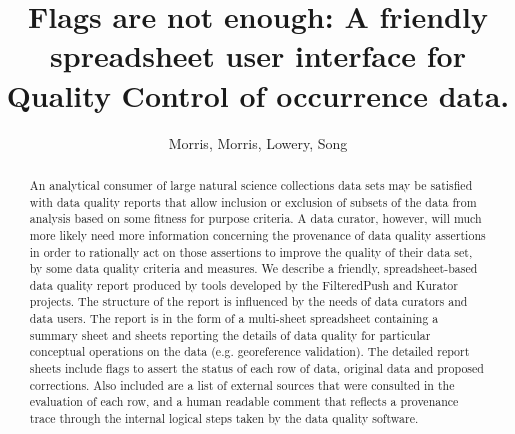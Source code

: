 \documentclass{article}
\begin{document}
\title{Flags are not enough: A friendly spreadsheet user interface for Quality Control of occurrence data.}
\maketitle
\author{Morris, Morris, Lowery, Song}
\begin{abstract}
An analytical consumer of large natural science collections data sets may be satisfied with data quality reports that allow inclusion or exclusion of subsets of the data from analysis based on some fitness for purpose criteria.  A data curator, however, will much more likely need more information concerning the provenance of data quality assertions in order to rationally act on those assertions to improve the quality of their data set, by some data quality criteria and measures.  We describe a friendly, spreadsheet-based data quality report produced by tools developed by the FilteredPush and Kurator projects. The structure of the report is influenced by the needs of data curators and data users.  The report is in the form of a multi-sheet spreadsheet containing a summary sheet and sheets reporting the details of data quality for particular conceptual operations on the data (e.g. georeference validation).  The detailed report sheets include flags to assert the status of each row of data, original data and proposed corrections. Also included are a list of external sources that were consulted in the evaluation of each row, and a human readable comment that reflects a provenance trace through the internal logical steps taken by the data quality software.  
\end{abstract}
\end{document}
